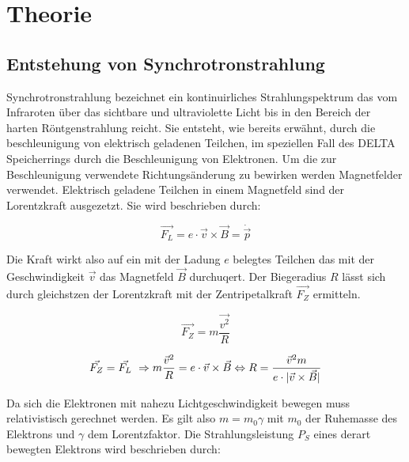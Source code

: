 \section{Theorie}
\label{sec:Theorie}

\subsection{Entstehung von Synchrotronstrahlung}
\label{sec:Synchrotronstrahlung}
Synchrotronstrahlung bezeichnet ein kontinuirliches Strahlungspektrum das vom Infraroten über das 
sichtbare und ultraviolette Licht bis in den Bereich der harten Röntgenstrahlung reicht. Sie entsteht, 
wie bereits erwähnt, durch die beschleunigung von elektrisch geladenen Teilchen, im speziellen Fall des
DELTA Speicherrings durch die Beschleunigung von Elektronen. Um die zur Beschleunigung verwendete 
Richtungsänderung zu bewirken werden Magnetfelder verwendet. Elektrisch geladene Teilchen in einem 
Magnetfeld sind der Lorentzkraft ausgezetzt. Sie wird beschrieben durch:

\begin{equation*}
    \vec{F_L} = e \cdot \vec{v} \times \vec{B} = \dot{\vec{p}}
\end{equation*}

Die Kraft wirkt also auf ein mit der Ladung $e$ belegtes Teilchen das mit der Geschwindigkeit $\vec{v}$
das Magnetfeld $\vec{B}$ durchuqert. Der Biegeradius $R$ lässt sich durch gleichstzen der Lorentzkraft 
mit der Zentripetalkraft $\vec{F_Z}$ ermitteln. 

\begin{equation*}
    \vec{F_Z} = m \frac{\vec{v^2}}{R}
\end{equation*}

\begin{equation*}
    \vec{F_Z} = \vec{F_L} \\\
    \Rightarrow m \frac{\vec{v}^2}{R} = e \cdot \vec{v} \times \vec{B}\\\\
    \Leftrightarrow R = \frac{\vec{v}^2 m}{e \cdot \lvert \vec{v} \times \vec{B} \rvert}
\end{equation*}

Da sich die Elektronen mit nahezu Lichtgeschwindigkeit bewegen muss relativistisch gerechnet werden.
Es gilt also $m=m_0\gamma$ mit $m_0$ der Ruhemasse des Elektrons und $\gamma$ dem Lorentzfaktor.
Die Strahlungsleistung $P_S$ eines derart bewegten Elektrons wird beschrieben durch:

